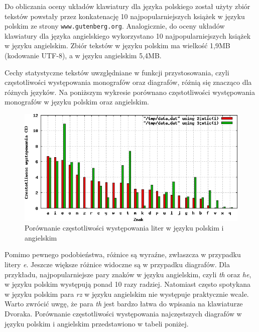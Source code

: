 \documentclass[brudnopis]{xmgr}
\begin{document}
Do obliczania oceny układów klawiatury dla języka polskiego został użyty zbiór tekstów powstały przez konkatenację 10 najpopularniejszych książek w języku polskim ze strony {\tt www.gutenberg.org}. Analogicznie, do oceny układów klawiatury dla języka angielskiego wykorzystano 10 najpopularniejszych książek w języku angielskim. Zbiór tekstów w języku polskim ma wielkość 1,9MB (kodowanie UTF-8), a w języku angielskim 5,4MB.

Cechy statystyczne tekstów uwzględniane w funkcji przystosowania, czyli częstotliwości występowania monografów oraz diagrafów, różnią się znacząco dla różnych języków. Na poniższym wykresie porównano częstotliwości występowania monografów w języku polskim oraz angielskim.

\begin{figure}[!tbh]
\centering
\includegraphics[width=.8\hsize]{fig/frequencies}
\caption{Porównanie częstotliwości występowania liter w języku polskim i angielskim}
\end{figure}

Pomimo pewnego podobieństwa, różnice są wyraźne, zwłaszcza w przypadku litery \emph{e}. Jeszcze większe różnice widoczne są w przypadku diagrafów. Dla przykładu, najpopularniejsze pary znaków w języku angielskim, czyli \emph{th} oraz \emph{he}, w języku polskim występują ponad 10 razy radziej. Natomiast często spotykana w języku polskim para \emph{rz} w języku angielskim nie występuje praktycznie wcale. Warto zwrócić uwgę, że para \emph{th} jest bardzo łatwa do wpisania na klawiaturze Dvoraka. Porównanie częstotliwości występowania najczęstszych diagrafów w języku polskim i angielskim przedstawiono w tabeli poniżej.
\end{document}

